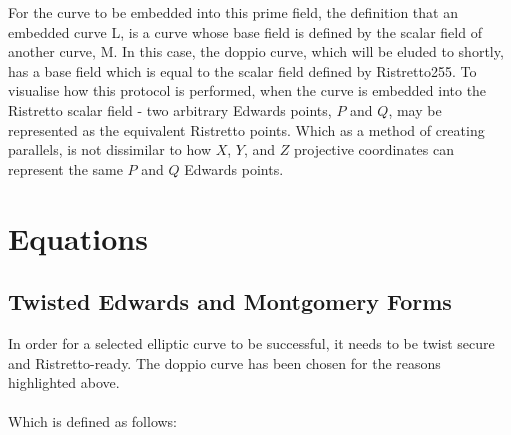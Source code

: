 \documentclass{article}
\begin{document}
For the curve to be embedded into this prime field, the definition that an embedded curve L, is a curve whose base field is defined by the scalar field of another curve, M. In this case, the doppio curve, which will be eluded to shortly, has a base field which is equal to the scalar field defined by Ristretto255. To visualise how this protocol is performed, when the curve is embedded into the Ristretto scalar field - two arbitrary Edwards points, $P$ and $Q$, may be represented as the equivalent Ristretto points. Which as a method of creating parallels, is not dissimilar to how $X$, $Y$, and $Z$ projective coordinates can represent the same $P$ and $Q$ Edwards points.
\section{Equations}
\subsection{Twisted Edwards and Montgomery Forms}
In order for a selected elliptic curve to be successful, it needs to be twist secure and Ristretto-ready. The doppio curve has been chosen for the reasons highlighted above. \\\\
Which is defined as follows: \\\\
\noindent{}
\end{document}
